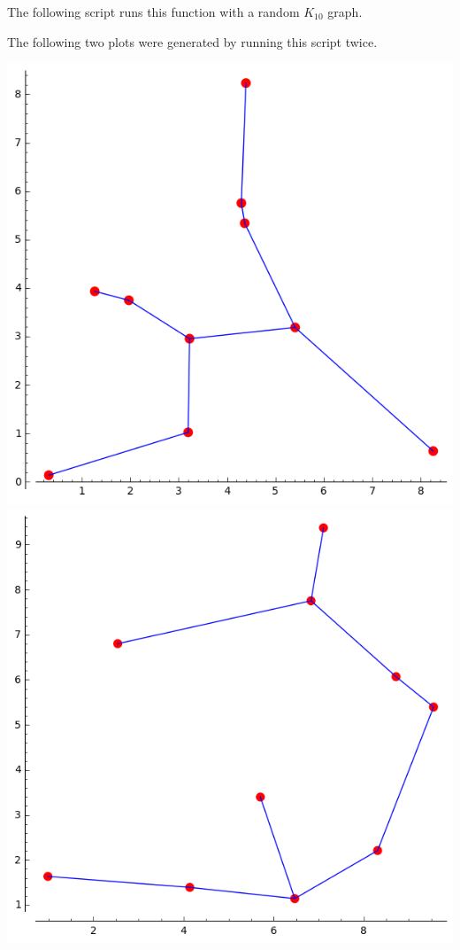 \documentclass[11pt, oneside]{article}
\begin{document}
\begin{enumerate}
    The following script runs this function with a random $K_{10}$ graph.
    
    The following two plots were generated by running this script twice.
    \begin{center}
      \includegraphics[scale=.5]{Figures/05_3.png} \\
      \includegraphics[scale=.5]{Figures/05_4.png}
    \end{center}
\end{enumerate}
\end{document}
